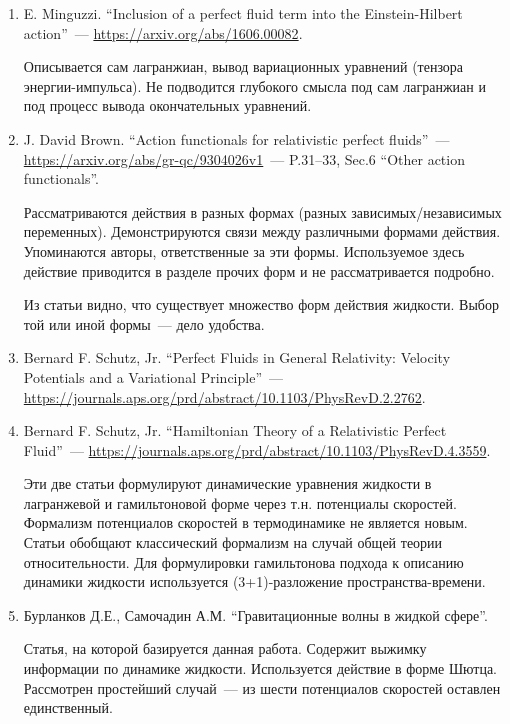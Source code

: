 \documentclass[\docroot/reports/draft/report.tex]{subfiles}
\begin{document}
    \begin{enumerate}
        \item E. Minguzzi. \enquote{Inclusion of a perfect fluid term into the Einstein-Hilbert action}~--- \url{https://arxiv.org/abs/1606.00082}.

        Описывается сам лагранжиан, вывод вариационных уравнений (тензора энергии-импульса). Не подводится глубокого смысла под сам лагранжиан и под процесс вывода окончательных уравнений.

        \item J. David Brown. \enquote{Action functionals for relativistic perfect fluids}~--- \url{https://arxiv.org/abs/gr-qc/9304026v1}~--- P.31--33, Sec.6 \enquote{Other action functionals}.

        Рассматриваются действия в разных формах (разных зависимых/независимых переменных). Демонстрируются связи между различными формами действия. Упоминаются авторы, ответственные за эти формы. Используемое здесь действие приводится в разделе прочих форм и не рассматривается подробно.

        Из статьи видно, что существует множество форм действия жидкости. Выбор той или иной формы~--- дело удобства.

        \item Bernard F. Schutz, Jr. \enquote{Perfect Fluids in General Relativity: Velocity Potentials and a Variational Principle}~--- \url{https://journals.aps.org/prd/abstract/10.1103/PhysRevD.2.2762}.

        \item Bernard F. Schutz, Jr. \enquote{Hamiltonian Theory of a Relativistic Perfect Fluid}~--- \url{https://journals.aps.org/prd/abstract/10.1103/PhysRevD.4.3559}.

        Эти две статьи формулируют динамические уравнения жидкости в лагранжевой и гамильтоновой форме через т.н. потенциалы скоростей. Формализм потенциалов скоростей в термодинамике не является новым. Статьи обобщают классический формализм на случай общей теории относительности. Для формулировки гамильтонова подхода к описанию динамики жидкости используется (3+1)-разложение пространства-времени.

        \item Бурланков Д.Е., Самочадин А.М. \enquote{Гравитационные волны в жидкой сфере}.

        Статья, на которой базируется данная работа. Содержит выжимку информации по динамике жидкости. Используется действие в форме Шютца. Рассмотрен простейший случай~--- из шести потенциалов скоростей оставлен единственный.
    \end{enumerate}

\end{document}
